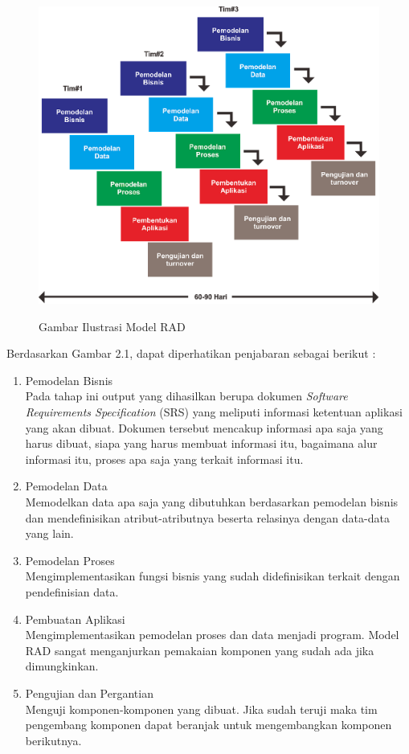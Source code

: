 \begin{flushleft}
\begin{justify}
\begin{figure}[ht]
	    \includegraphics[width=12cm]{images/RAD.png}\\
            \caption{Gambar Ilustrasi Model RAD}
        \end{figure}
        Berdasarkan Gambar 2.1, dapat diperhatikan penjabaran sebagai berikut :
        \begin{enumerate}[label=\alph*.]
            \item Pemodelan Bisnis\\
            Pada tahap ini output yang dihasilkan berupa dokumen \textit{Software Requirements Specification} (SRS) yang meliputi informasi ketentuan aplikasi yang akan dibuat. Dokumen tersebut mencakup informasi apa saja yang harus dibuat, siapa yang harus membuat informasi itu, bagaimana alur informasi itu, proses apa saja yang terkait informasi itu.
            \item Pemodelan Data\\
            Memodelkan data apa saja yang dibutuhkan berdasarkan pemodelan bisnis dan mendefinisikan atribut-atributnya beserta relasinya dengan data-data yang lain. 
            \item Pemodelan Proses\\
            Mengimplementasikan fungsi bisnis yang sudah didefinisikan terkait dengan pendefinisian data. 
            \item Pembuatan Aplikasi\\
            Mengimplementasikan pemodelan proses dan data menjadi program. Model RAD sangat menganjurkan pemakaian komponen yang sudah ada jika dimungkinkan.
            \item Pengujian dan Pergantian\\
            Menguji komponen-komponen yang dibuat. Jika sudah teruji maka tim pengembang komponen dapat beranjak untuk mengembangkan komponen berikutnya.\\
        \end{enumerate}


\end{justify}
\end{flushleft}
